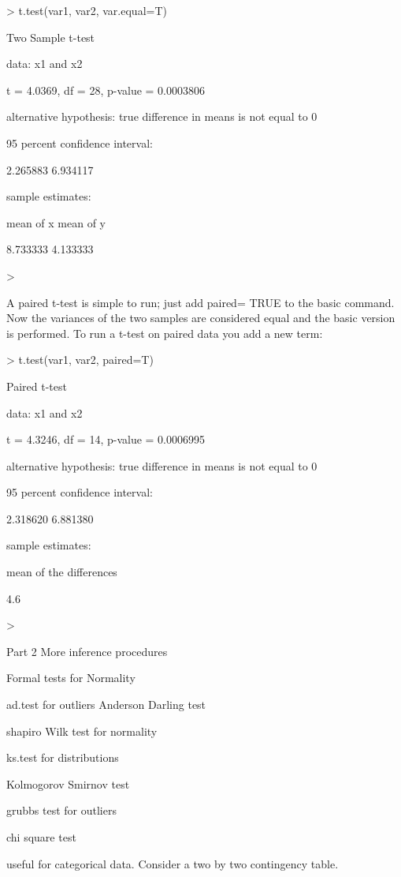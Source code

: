 > t.test(var1, var2, var.equal=T)

Two Sample t-test

data: x1 and x2

t = 4.0369, df = 28, p-value = 0.0003806

alternative hypothesis: true difference in means is not equal to 0

95 percent confidence interval:

2.265883 6.934117

sample estimates:

mean of x mean of y

8.733333 4.133333

>

 



A paired t-test is simple to run; just add paired= TRUE to the basic command. Now the variances of the two samples are considered equal and the basic version is performed. To run a t-test on paired data you add a new term:

> t.test(var1, var2, paired=T)

Paired t-test

data: x1 and x2

t = 4.3246, df = 14, p-value = 0.0006995

alternative hypothesis: true difference in means is not equal to 0

95 percent confidence interval:

2.318620 6.881380

sample estimates:

mean of the differences

4.6

>

 






Part 2 More inference procedures

Formal tests for Normality



ad.test for outliers Anderson Darling test


shapiro Wilk test for normality


ks.test for distributions

Kolmogorov Smirnov test

grubbs test for outliers

chi square test


useful for categorical data. Consider a two by two contingency table.


